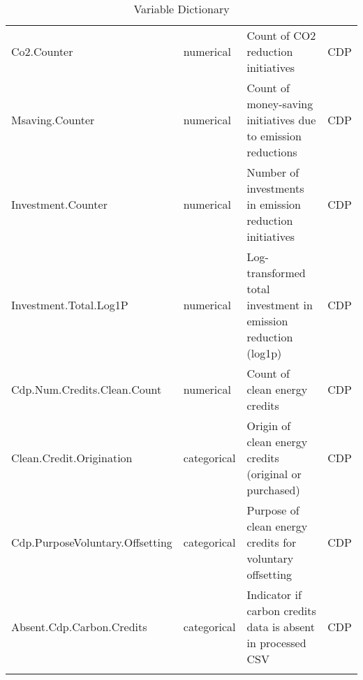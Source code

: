 \begin{longtable}{lp{2cm}p{5cm}p{2cm}}
    Co2.Counter & numerical & Count of CO2 reduction initiatives & CDP \\
    Msaving.Counter & numerical & Count of money-saving initiatives due to emission reductions & CDP \\
    Investment.Counter & numerical & Number of investments in emission reduction initiatives & CDP \\
    Investment.Total.Log1P & numerical & Log-transformed total investment in emission reduction (log1p) & CDP \\
    Cdp.Num.Credits.Clean.Count & numerical & Count of clean energy credits & CDP \\
    Clean.Credit.Origination & categorical & Origin of clean energy credits (original or purchased) & CDP \\
    Cdp.PurposeVoluntary.Offsetting & categorical & Purpose of clean energy credits for voluntary offsetting & CDP \\
    Absent.Cdp.Carbon.Credits & categorical & Indicator if carbon credits data is absent in processed CSV & CDP \\
    \bottomrule
\caption{Variable Dictionary}
\label{tab:variable-dictionary}
\end{longtable}